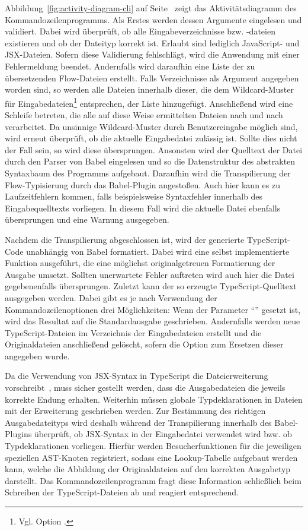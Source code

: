 Abbildung~\ref{fig:activity-diagram-cli} auf Seite~\pageref{fig:activity-diagram-cli} zeigt das Aktivitätsdiagramm des Kommandozeilenprogramms. Als Erstes werden dessen Argumente eingelesen und validiert. Dabei wird überprüft, ob alle Eingabeverzeichnisse bzw. -dateien existieren und ob der Dateityp korrekt ist. Erlaubt sind lediglich JavaScript- und JSX-Dateien. Sofern diese Validierung fehlschlägt, wird die Anwendung mit einer Fehlermeldung beendet. Andernfalls wird daraufhin eine Liste der zu übersetzenden Flow-Dateien erstellt. Falls Verzeichnisse als Argument angegeben worden sind, so werden alle Dateien innerhalb dieser, die dem Wildcard-Muster für Eingabedateien\footnote{Vgl. Option .} entsprechen, der Liste hinzugefügt. Anschließend wird eine Schleife betreten, die alle auf diese Weise ermittelten Dateien nach und nach verarbeitet. Da unsinnige Wildcard-Muster durch Benutzereingabe möglich sind, wird erneut überprüft, ob die aktuelle Eingabedatei zulässig ist. Sollte dies nicht der Fall sein, so wird diese übersprungen. Ansonsten wird der Quelltext der Datei durch den Parser von Babel eingelesen und so die Datenstruktur des abstrakten Syntaxbaum des Programms aufgebaut. Daraufhin wird die Transpilierung der Flow-Typisierung durch das Babel-Plugin angestoßen. Auch hier kann es zu Laufzeitfehlern kommen, falls beispielsweise Syntaxfehler innerhalb des Eingabequelltexts vorliegen. In diesem Fall wird die aktuelle Datei ebenfalls übersprungen und eine Warnung ausgegeben.

Nachdem die Transpilierung abgeschlossen ist, wird der generierte TypeScript-Code unabhängig von Babel formatiert. Dabei wird eine selbst implementierte Funktion ausgeführt, die eine möglichst originalgetreuen Formatierung der Ausgabe umsetzt. Sollten unerwartete Fehler auftreten wird auch hier die Datei gegebenenfalls übersprungen. Zuletzt kann der so erzeugte TypeScript-Quelltext ausgegeben werden. Dabei gibt es je nach Verwendung der Kommandozeilenoptionen drei Möglichkeiten: Wenn der Parameter \enquote{} gesetzt ist, wird das Resultat auf die Standardausgabe geschrieben. Andernfalls werden neue TypeScript-Dateien im Verzeichnis der Eingabedateien erstellt und die Originaldateien anschließend gelöscht, sofern die Option zum Ersetzen dieser angegeben wurde.

Da die Verwendung von JSX-Syntax in TypeScript die Dateierweiterung  vorschreibt~\autocite{TS:HANDBOOK:JSX}, muss sicher gestellt werden, dass die Ausgabedateien die jeweils korrekte Endung erhalten. Weiterhin müssen globale Typdeklarationen in Dateien mit der Erweiterung  geschrieben werden. Zur Bestimmung des richtigen Ausgabedateityps wird deshalb während der Transpilierung innerhalb des Babel-Plugins überprüft, ob JSX-Syntax in der Eingabedatei verwendet wird bzw. ob Typdeklarationen vorliegen. Hierfür werden Besucherfunktionen für die jeweiligen speziellen AST-Knoten registriert, sodass eine Lookup-Tabelle aufgebaut werden kann, welche die Abbildung der Originaldateien auf den korrekten Ausgabetyp darstellt. Das Kommandozeilenprogramm fragt diese Information schließlich beim Schreiben der TypeScript-Dateien ab und reagiert entsprechend.


